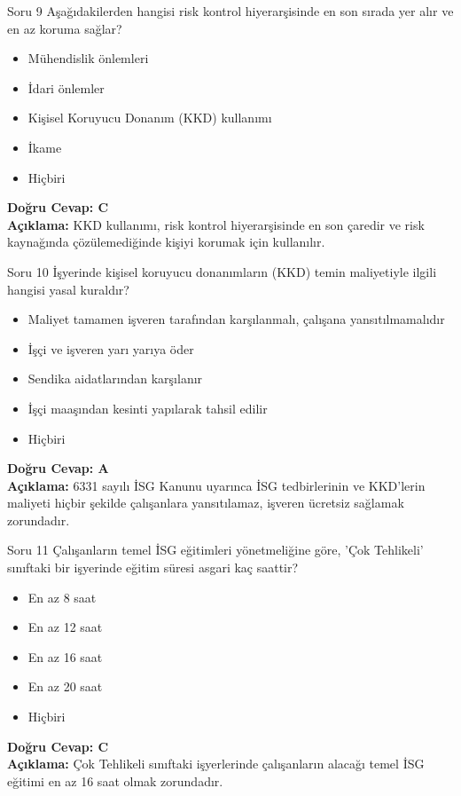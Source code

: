 \documentclass[12pt,a4paper]{article}
\begin{document}
\begin{testcard}{Soru 9}
    Aşağıdakilerden hangisi risk kontrol hiyerarşisinde en son sırada yer alır ve en az koruma sağlar?
    \begin{itemize}
        \item[A)] Mühendislik önlemleri
        \item[B)] İdari önlemler
        \item[C)] Kişisel Koruyucu Donanım (KKD) kullanımı
        \item[D)] İkame
        \item[E)] Hiçbiri
    \end{itemize}
    \tcblower
    \textbf{Doğru Cevap: C} \\
    \textbf{Açıklama:} KKD kullanımı, risk kontrol hiyerarşisinde en son çaredir ve risk kaynağında çözülemediğinde kişiyi korumak için kullanılır.
\end{testcard}

\begin{testcard}{Soru 10}
    İşyerinde kişisel koruyucu donanımların (KKD) temin maliyetiyle ilgili hangisi yasal kuraldır?
    \begin{itemize}
        \item[A)] Maliyet tamamen işveren tarafından karşılanmalı, çalışana yansıtılmamalıdır
        \item[B)] İşçi ve işveren yarı yarıya öder
        \item[C)] Sendika aidatlarından karşılanır
        \item[D)] İşçi maaşından kesinti yapılarak tahsil edilir
        \item[E)] Hiçbiri
    \end{itemize}
    \tcblower
    \textbf{Doğru Cevap: A} \\
    \textbf{Açıklama:} 6331 sayılı İSG Kanunu uyarınca İSG tedbirlerinin ve KKD'lerin maliyeti hiçbir şekilde çalışanlara yansıtılamaz, işveren ücretsiz sağlamak zorundadır.
\end{testcard}

\begin{testcard}{Soru 11}
    Çalışanların temel İSG eğitimleri yönetmeliğine göre, 'Çok Tehlikeli' sınıftaki bir işyerinde eğitim süresi asgari kaç saattir?
    \begin{itemize}
        \item[A)] En az 8 saat
        \item[B)] En az 12 saat
        \item[C)] En az 16 saat
        \item[D)] En az 20 saat
        \item[E)] Hiçbiri
    \end{itemize}
    \tcblower
    \textbf{Doğru Cevap: C} \\
    \textbf{Açıklama:} Çok Tehlikeli sınıftaki işyerlerinde çalışanların alacağı temel İSG eğitimi en az 16 saat olmak zorundadır.
\end{testcard}
\end{document}
